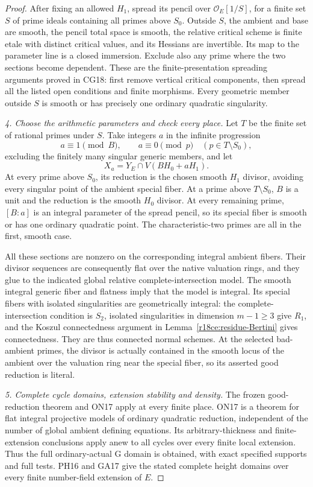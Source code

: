 \begin{proof}
After fixing an allowed $H_1$, spread its pencil over
$\mathcal O_E[1/S]$, for a finite set $S$ of prime
ideals containing all primes above $S_0$.  Outside
$S$, the ambient and base are smooth, the pencil
total space is smooth, the relative critical scheme
is finite etale with distinct critical values, and
its Hessians are invertible.  Its map to the
parameter line is a closed immersion.  Exclude
also any prime where the two sections become
dependent.  These are the finite-presentation
spreading arguments proved in CG18: first remove
vertical critical components, then spread all the
listed open conditions and finite morphisms.
Every geometric member outside $S$ is smooth or
has precisely one ordinary quadratic singularity.

\emph{4. Choose the arithmetic parameters and check every place.}
Let $T$ be the finite set of rational primes under
$S$.  Take integers $a$ in the infinite progression
\[
       a\equiv1\pmod B,
       \qquad a\equiv0\pmod p\quad(p\in T\setminus S_0),
 \tag{CE18.3}\label{r18ce:parameter-CRT}
\]
excluding the finitely many singular generic members,
and let
\[
                         X_a=Y_E\cap V(BH_0+aH_1).
 \tag{CE18.4}\label{r18ce:ordinary-equation}
\]
At every prime above $S_0$, its reduction is the
chosen smooth $H_1$ divisor, avoiding every singular
point of the ambient special fiber.  At a prime
above $T\setminus S_0$, $B$ is a unit and the
reduction is the smooth $H_0$ divisor.  At every
remaining prime, $[B:a]$ is an integral parameter
of the spread pencil, so its special fiber is
smooth or has one ordinary quadratic point.
The characteristic-two primes are all in the
first, smooth case.

All these sections are nonzero on the corresponding
integral ambient fibers.  Their divisor sequences
are consequently flat over the native valuation
rings, and they glue to the indicated global
relative complete-intersection model.  The smooth
integral generic fiber and flatness imply that
the model is integral.  Its special fibers with
isolated singularities are geometrically integral:
the complete-intersection condition is $S_2$,
isolated singularities in dimension $m-1\ge3$
give $R_1$, and the Koszul connectedness argument
in Lemma~\ref{r18ce:residue-Bertini} gives
connectedness.  They are thus connected normal
schemes.  At the selected bad-ambient primes,
the divisor is actually contained in the smooth
locus of the ambient over the valuation ring
near the special fiber, so its asserted good
reduction is literal.

\emph{5. Complete cycle domains, extension stability and density.}
The frozen good-reduction theorem and ON17 apply
at every finite place.  ON17 is a theorem for
flat integral projective models of ordinary
quadratic reduction, independent of the number
of global ambient defining equations.  Its
arbitrary-thickness and finite-extension
conclusions apply anew to all cycles over
every finite local extension.  Thus the
full ordinary-actual G domain is obtained,
with exact specified supports and full tests.
PH16 and GA17 give the stated complete height
domains over every finite number-field
extension of $E$.


\end{proof}
